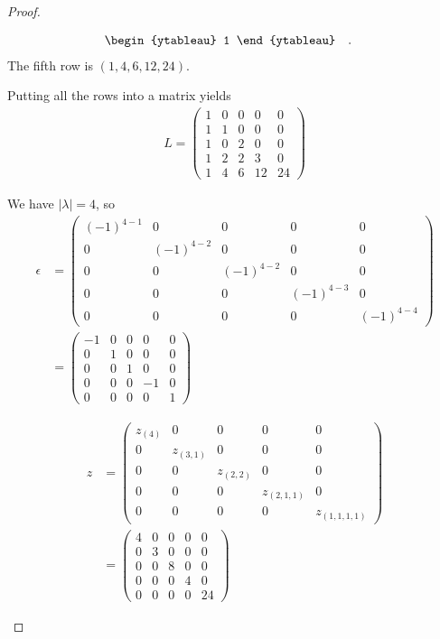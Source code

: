 \documentclass[12pt]{extarticle}
\newcommand{\abs}[1]{|#1|}
\newcommand{\<}{\langle}
\renewcommand{\>}{\rangle}
\theoremstyle{definition}
\begin{document}
\begin{proof}
\begin{enumerate}
\begin{itemize}
\begin{align*}
\begin{ytableau}
          1
        \end{ytableau}\quad.\quad
      \end{align*}
      The fifth row is $(1,4,6,12,24)$.
    \end{itemize}
    Putting all the rows into a matrix yields
    \begin{align*}
      L = 
      \begin{pmatrix}
        1 & 0 & 0 & 0 & 0 \\
        1 & 1 & 0 & 0 & 0 \\
        1 & 0 & 2 & 0 & 0 \\
        1 & 2 & 2 & 3 & 0 \\
        1 & 4 & 6 & 12 & 24
      \end{pmatrix}
    \end{align*}

    We have $\abs{\lambda} = 4$, so 
    \begin{align*}
      \epsilon
      &= 
      \begin{pmatrix}
        (-1)^{4-1} & 0 & 0 & 0 & 0 \\
        0 & (-1)^{4-2} & 0 & 0 & 0 \\
        0 & 0 & (-1)^{4-2} & 0 & 0 \\
        0 & 0 & 0 & (-1)^{4-3} & 0 \\
        0 & 0 & 0 & 0 & (-1)^{4-4} 
      \end{pmatrix} \\
      &=
      \begin{pmatrix}
        -1 & 0 & 0 & 0 & 0 \\
        0 & 1 & 0 & 0 & 0 \\
        0 & 0 & 1 & 0 & 0 \\
        0 & 0 & 0 & -1 & 0 \\
        0 & 0 & 0 & 0 & 1
      \end{pmatrix}
    \end{align*}

    \begin{align*}
      z
      &=
      \begin{pmatrix}
        z_{(4)} & 0 & 0 & 0 & 0 \\
        0 & z_{(3,1)} & 0 & 0 & 0 \\
        0 & 0 & z_{(2,2)} & 0 & 0 \\
        0 & 0 & 0 & z_{(2,1,1)} & 0 \\
        0 & 0 & 0 & 0 & z_{(1,1,1,1)}
      \end{pmatrix} \\
      &=
      \begin{pmatrix}
        4 & 0 & 0 & 0 & 0 \\
        0 & 3 & 0 & 0 & 0 \\
        0 & 0 & 8 & 0 & 0 \\
        0 & 0 & 0 & 4 & 0 \\
        0 & 0 & 0 & 0 & 24
      \end{pmatrix}
    \end{align*}
  \end{enumerate}
\end{proof}
\end{document}
